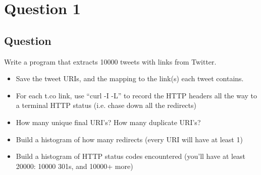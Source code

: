 \chapter{Question 1}
\label{question-1}
\section{Question}

Write a program that extracts 10000 tweets with links from Twitter.

\begin{itemize}
\item Save the tweet URIs, and the mapping to the link(s) each tweet contains.
\item For each t.co link, use ``curl -I -L'' to record the HTTP headers all the way to a terminal HTTP status (i.e. chase down all the redirects)
\item How many unique final URI's? How many duplicate URI's?
\item Build a histogram of how many redirects (every URI will have at least 1)
\item Build a histogram of HTTP status codes encountered (you’ll have at least 20000: 10000 301s, and 10000+ more)
\end{itemize}

